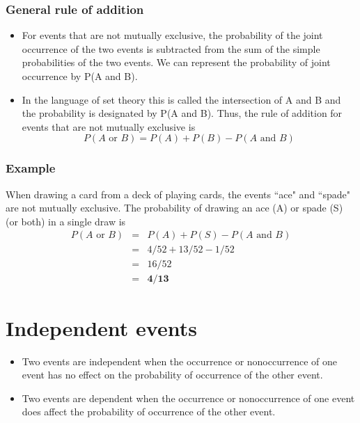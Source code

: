 \documentclass[IntroMain.tex]{subfiles}
\begin{document}
	\begin{frame}
		\frametitle{General rule of addition}
		\begin{itemize}
			\item For events that are not mutually exclusive, the probability of the joint occurrence of the two events is
			subtracted from the sum of the simple probabilities of the two events. We can represent the probability of joint
			occurrence by P(A and B).\item  In the language of set theory this is called the intersection of A and B and the
			probability is designated by P(A and B).  Thus, the rule of addition for events that are not mutually exclusive is
			\[ P(A \mbox{ or }B) = P(A)+ P(B) - P(A \mbox{ and }B)\]
		\end{itemize}
	\end{frame}
	\begin{frame} 
		\frametitle{Example}
		\Large
		When drawing a card from a deck of playing cards, the events ``ace" and ``spade" are not mutually
		exclusive. The probability of drawing an ace (A) or spade (S) (or both) in a single draw is
		\begin{eqnarray} P(A \mbox{ or }B) &=& P(A) + P(S) - P(A \mbox{ and }B)\\ &=& 4/52 + 13/52 -1/52 \\&=& 16/52 \\
		&=& \textbf{4/13} 
		\end{eqnarray}
	\end{frame}
	\section*{Independent events}
	\begin{frame}
		\Large
		\begin{itemize}
			\item Two events are independent when the occurrence or nonoccurrence of one event has no effect on the
			probability of occurrence of the other event. 
			
			\item Two events are dependent when the occurrence or nonoccurrence
			of one event does affect the probability of occurrence of the other event.
		\end{itemize}
		
	\end{frame}
	
\end{document}
